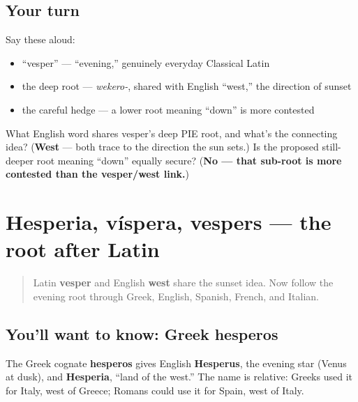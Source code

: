 \subsection*{Your turn}
Say these aloud:

\begin{itemize}
\raggedright
  \item \textquotedblleft{}vesper\textquotedblright{} — \textquotedblleft{}evening,\textquotedblright{} genuinely everyday Classical Latin
  \item the deep root — \emph{wekero-}, shared with English \textquotedblleft{}west,\textquotedblright{} the direction of sunset
  \item the careful hedge — a lower root meaning \textquotedblleft{}down\textquotedblright{} is more contested
\end{itemize}

\begin{tcolorbox}[breakable,colback=teal!4,colframe=teal!35!black,title={Before you move on}]
What English word shares vesper's deep PIE root, and what's the connecting idea? (\textbf{West} — both trace to the direction the sun sets.) Is the proposed still-deeper root meaning \textquotedblleft{}down\textquotedblright{} equally secure? (\textbf{No — that sub-root is more contested than the vesper/west link.})
\end{tcolorbox}
\section[Hesperia, víspera, vespers]{Hesperia, víspera, vespers — the root after Latin}

\label{lesson:LA-C33-vesper-afterlives}



\begin{quote}
Latin \textbf{vesper} and English \textbf{west} share the sunset idea. Now follow the evening root through Greek, English, Spanish, French, and Italian.
\end{quote}

\subsection*{You'll want to know: Greek hesperos}
The Greek cognate \textbf{hesperos} gives English \textbf{Hesperus}, the evening star (Venus at dusk), and \textbf{Hesperia}, \textquotedblleft{}land of the west.\textquotedblright{} The name is relative: Greeks used it for Italy, west of Greece; Romans could use it for Spain, west of Italy.

